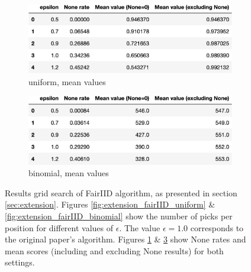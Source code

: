 \begin{figure}[h!]
  \begin{subfigure}[t]{.5\textwidth}
    \centering
    \includegraphics[width=\linewidth]{Images/extension/FairIIDProphet_uniform_table.jpeg}
    \caption{uniform, mean values}
    \label{fig:extension_fairIID_uniform_table}
  \end{subfigure}
  \hfill
  \begin{subfigure}[t]{.5\textwidth}
    \centering
    \includegraphics[width=\linewidth]{Images/extension/FairIIDProphet_binomial_table.jpeg}
    \caption{binomial, mean values}
    \label{fig:extension_fairIID_binomial_table}
  \end{subfigure}
  
  \caption{
  Results grid search of FairIID algorithm, as presented in section \ref{sec:extension}. Figures \ref{fig:extension_fairIID_uniform} \& \ref{fig:extension_fairIID_binomial} show the number of picks per position for different values of $\epsilon$. The value $\epsilon = 1.0$ corresponds to the original paper's algorithm. Figures \ref{fig:extension_fairIID_uniform_table} \& \ref{fig:extension_fairIID_binomial_table} show None rates and mean scores (including and excluding None results) for both settings.
  }
\end{figure}